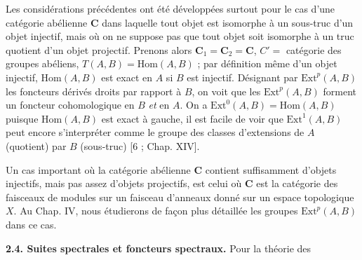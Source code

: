 Les considérations précédentes ont été développées surtout pour le cas d'une
catégorie abélienne $\mathbf{C}$ dans laquelle tout objet est isomorphe à un sous-truc
d'un objet injectif, mais où on ne suppose pas que tout objet soit isomorphe à
un truc quotient d'un objet projectif. Prenons alors $\mathbf{C}_1=\mathbf{C}_2=\mathbf{C}$, $C'=$
catégorie des groupes abéliens, $T(A,B)=\mathrm{Hom}(A,B)$ ; par définition
même d'un objet injectif, $\mathrm{Hom}(A,B)$ est exact en $A$ si $B$ est
injectif. Désignant par $\mathrm{Ext}^p(A,B)$ les foncteurs dérivés droits par
rapport à $B$, on voit que les $\mathrm{Ext}^p(A,B)$ forment un foncteur
cohomologique en $B$ \textit{et} en $A$. On a
$\mathrm{Ext}^0(A,B)=\mathrm{Hom}(A,B)$ puisque $\mathrm{Hom}(A,B)$ est exact
à gauche, il est facile de voir que $\mathrm{Ext}^1(A,B)$ peut encore
s'interpréter comme le groupe des classes d'extensions de $A$ (quotient) par
$B$ (sous-truc) [6 ; Chap. XIV].

Un cas important où la catégorie abélienne $\mathbf{C}$ contient suffisamment d'objets
injectifs, mais pas assez d'objets projectifs, est celui où $\mathbf{C}$ est la
catégorie des faisceaux de modules sur un faisceau d'anneaux donné sur un
espace topologique $X$. Au Chap. IV, nous étudierons de façon plus détaillée
les groupes $\mathrm{Ext}^p(A,B)$ dans ce cas.

\textbf{2.4. Suites spectrales et foncteurs spectraux.} Pour la
théorie des

